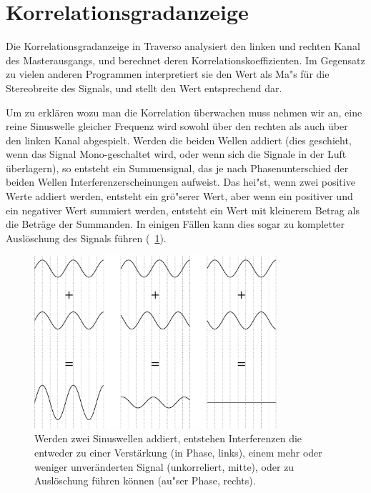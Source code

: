 \section{Korrelationsgradanzeige}
Die Korrelationsgradanzeige in Traverso analysiert den linken und rechten Kanal des Masterausgangs, und berechnet deren Korrelationskoeffizienten. Im Gegensatz zu vielen anderen Programmen interpretiert sie den Wert als Ma"s für die Stereobreite des Signals, und stellt den Wert entsprechend dar.

Um zu erklären wozu man die Korrelation überwachen muss nehmen wir an, eine reine Sinuswelle gleicher Frequenz wird sowohl über den rechten als auch über den linken Kanal abgespielt. Werden die beiden Wellen addiert (dies geschieht, wenn das Signal Mono-geschaltet wird, oder wenn sich die Signale in der Luft überlagern), so entsteht ein Summensignal, das je nach Phasenunterschied der beiden Wellen Interferenzerscheinungen aufweist. Das hei"st, wenn zwei positive Werte addiert werden, entsteht ein grö"serer Wert, aber wenn ein positiver und ein negativer Wert summiert werden, entsteht ein Wert mit kleinerem Betrag als die Beträge der Summanden. In einigen Fällen kann dies sogar zu kompletter Auslöschung des Signals führen (\FigB\ \ref{fig_interference}).

\begin{figure}
	\centering\includegraphics[width=0.8\textwidth]{images/sine01}
	\caption{Werden zwei Sinuswellen addiert, entstehen Interferenzen die entweder zu einer Verstärkung (in Phase, links), einem mehr oder weniger unveränderten Signal (unkorreliert, mitte), oder zu Auslöschung führen können (au"ser Phase, rechts).}
	\label{fig_interference}
\end{figure}

